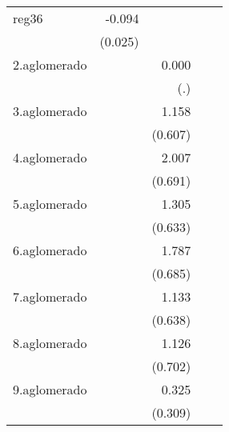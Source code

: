 {\begin{longtable}{l*{4}{D{.}{.}{-1}}}
\addlinespace
reg36       &      -0.094\sym{***}&                     &                     &                     \\
            &     (0.025)         &                     &                     &                     \\
\addlinespace
2.aglomerado&                     &       0.000         &                     &                     \\
            &                     &         (.)         &                     &                     \\
\addlinespace
3.aglomerado&                     &       1.158         &                     &                     \\
            &                     &     (0.607)         &                     &                     \\
\addlinespace
4.aglomerado&                     &       2.007\sym{**} &                     &                     \\
            &                     &     (0.691)         &                     &                     \\
\addlinespace
5.aglomerado&                     &       1.305\sym{*}  &                     &                     \\
            &                     &     (0.633)         &                     &                     \\
\addlinespace
6.aglomerado&                     &       1.787\sym{**} &                     &                     \\
            &                     &     (0.685)         &                     &                     \\
\addlinespace
7.aglomerado&                     &       1.133         &                     &                     \\
            &                     &     (0.638)         &                     &                     \\
\addlinespace
8.aglomerado&                     &       1.126         &                     &                     \\
            &                     &     (0.702)         &                     &                     \\
\addlinespace
9.aglomerado&                     &       0.325         &                     &                     \\
            &                     &     (0.309)         &                     &                     \\

\end{longtable}}

